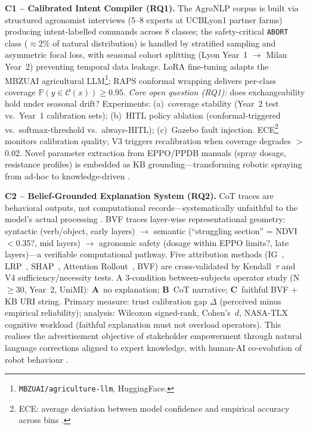 \documentclass[11pt,a4paper]{article}
\begin{document}
\textbf{C1 -- Calibrated Intent Compiler (RQ1).}
The AgroNLP corpus is built via structured agronomist interviews (5--8 experts at UCBLyon1 partner farms) producing intent-labelled commands across 8 classes; the safety-critical \texttt{ABORT} class ($\approx$2\% of natural distribution) is handled by stratified sampling and asymmetric focal loss, with seasonal cohort splitting (Lyon Year~1 $\to$ Milan Year~2) preventing temporal data leakage.
LoRA fine-tuning adapts the MBZUAI agricultural LLM\footnote{\scriptsize\texttt{MBZUAI/agriculture-llm}, HuggingFace.}; RAPS conformal wrapping \citep{angelopoulos_2023} delivers per-class coverage $\mathbb{P}(y\in\mathcal{C}(x))\geq 0.95$.
\textit{Core open question (RQ1):} does exchangeability hold under seasonal drift?
Experiments: (a)~coverage stability (Year~2 test vs.\ Year~1 calibration sets); (b)~HITL policy ablation (conformal-triggered vs.\ softmax-threshold vs.\ always-HITL); (c)~Gazebo fault injection.
ECE\footnote{ECE: average deviation between model confidence and empirical accuracy across bins \citep{guo_calibration_2017}.} monitors calibration quality; V3 triggers recalibration when coverage degrades $>$0.02.
Novel parameter extraction from EPPO/PPDB manuals (spray dosage, resistance profiles) is embedded as KB grounding---transforming robotic spraying from ad-hoc to knowledge-driven \citep{phd_adv_2026}.

\textbf{C2 -- Belief-Grounded Explanation System (RQ2).}
CoT traces are behavioral outputs, not computational records---systematically unfaithful to the model's actual processing \citep{turpin_2023,kambhampati_2025,oxford_cot_2025}.
BVF \citep{saha_bvf_2026} traces layer-wise representational geometry: syntactic (verb/object, early layers) $\to$ semantic (``struggling section'' = NDVI$<$0.35?, mid layers) $\to$ agronomic safety (dosage within EPPO limits?, late layers)---a verifiable computational pathway.
Five attribution methods (IG~\citep{sundararajan_ig_2017}, LRP~\citep{bach_lrp_2015}, SHAP~\citep{lundberg_shap_2017}, Attention Rollout~\citep{abnar_attention_2020}, BVF) are cross-validated by Kendall~$\tau$ and V4 sufficiency/necessity tests.
A 3-condition between-subjects operator study (N$\geq$30, Year~2, UniMI): \textbf{A}~no explanation; \textbf{B}~CoT narrative; \textbf{C}~faithful BVF + KB URI string.
Primary measure: trust calibration gap $\Delta$ (perceived minus empirical reliability); analysis: Wilcoxon signed-rank, Cohen's~$d$, NASA-TLX cognitive workload (faithful explanation must not overload operators).
This realises the advertisement objective of stakeholder empowerment through natural language corrections aligned to expert knowledge, with human-AI co-evolution of robot behaviour \citep{phd_adv_2026}.
\end{document}
